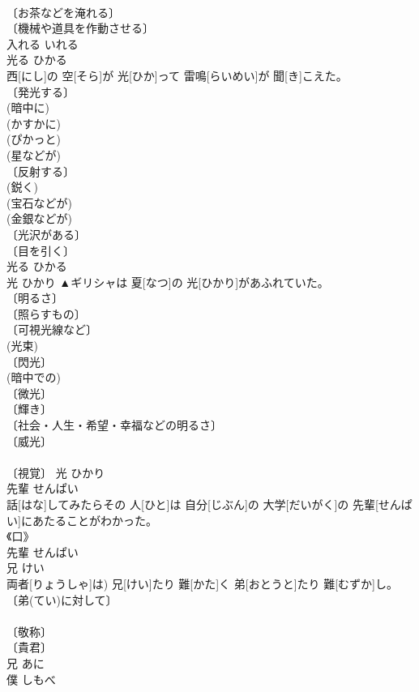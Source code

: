 \documentclass[8pt]{extreport}
\begin{document}
\begin{CJK}{UTF8}{min}
\\	〔お茶などを淹れる〕 
\\	〔機械や道具を作動させる〕 
\\	入れる	いれる	
\\	光る	ひかる	
\\	西[にし]の 空[そら]が 光[ひか]って 雷鳴[らいめい]が 聞[き]こえた。	
\\	〔発光する〕 
\\	(暗中に) 
\\	(かすかに) 
\\	(ぴかっと) 
\\	(星などが) 
\\	〔反射する〕 
\\	(鋭く) 
\\	(宝石などが) 
\\	(金銀などが) 
\\	〔光沢がある〕 
\\	〔目を引く〕 
\\	光る	ひかる	
\\	光	ひかり	▲ギリシャは 夏[なつ]の 光[ひかり]があふれていた。	
\\	〔明るさ〕 
\\	〔照らすもの〕 
\\	〔可視光線など〕 
\\	(光束) 
\\	〔閃光〕 
\\	(暗中での) 
\\	〔微光〕 
\\	〔輝き〕 
\\	〔社会・人生・希望・幸福などの明るさ〕 
\\	〔威光〕 
\\	[⇒ななひかり] 
\\	〔視覚〕	光	ひかり	
\\	先輩	せんぱい	
\\	話[はな]してみたらその 人[ひと]は 自分[じぶん]の 大学[だいがく]の 先輩[せんぱい]にあたることがわかった。	
\\	《口》 
\\	先輩	せんぱい	
\\	兄	けい	
\\	両者[りょうしゃ]は) 兄[けい]たり 難[かた]く 弟[おとうと]たり 難[むずか]し。	
\\	〔弟(てい)に対して〕 
\\	[＝あに１] 
\\	〔敬称〕 
\\	〔貴君〕 
\\	兄	あに	
\\	僕	しもべ	

\end{CJK}
\end{document}
